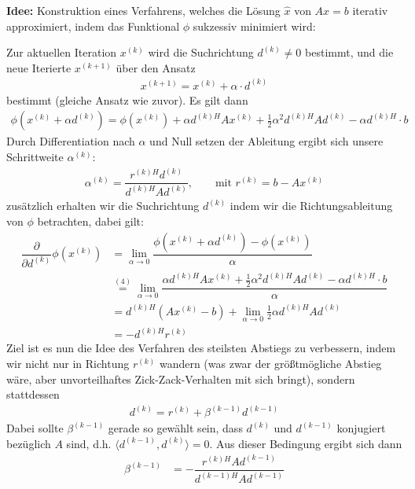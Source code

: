 \textbf{Idee:} Konstruktion eines Verfahrens, welches die Lösung $\hat{x}$ von $Ax=b$ iterativ approximiert, 
indem das Funktional $\phi$ sukzessiv minimiert wird: 

Zur aktuellen Iteration $x^{(k)}$ wird die Suchrichtung $d^{(k)}\neq 0$ bestimmt, und die neue Iterierte 
$x^{(k+1)}$ über den Ansatz
% 
\begin{align*}
  x^{(k+1)} 
  = x^{(k)} + \alpha\cdot d^{(k)} 
  \tag{3}\label{eq:CGVeq3}
\end{align*}
%
bestimmt (gleiche Ansatz wie zuvor). Es gilt dann
%
\begin{align*}
  \phi(x^{(k)}+\alpha d^{(k)}) 
  = \phi(x^{(k)}) + \alpha d^{(k)H}A x^{(k)} + \tfrac{1}{2}\alpha^2 {d^{(k)H}}Ad^{(k)}-\alpha{d^{(k)H}}\cdot b 
  \tag{4}\label{eq:CGVeq4}
\end{align*}
%
Durch Differentiation nach $\alpha$ und Null setzen der Ableitung ergibt sich unsere Schrittweite $\alpha^{(k)}$:
%
\begin{align*}
  \alpha^{(k)} 
  = \dfrac{{r^{(k)H}} d^{(k)}}{{d^{(k)H}} A d^{(k)}},
  \qquad \text{mit } 
  r^{(k)}
  = b-Ax^{(k)} 
  \tag{5}\label{eq:CGVeq5}
\end{align*}
zusätzlich erhalten wir die Suchrichtung $d^{(k)}$ indem wir die Richtungsableitung von $\phi$ betrachten, dabei gilt:
%
\begin{align*}
  \dfrac{\partial}{\partial d^{(k)}} \phi(x^{(k)}) 
  &= \lim_{\alpha\to 0} \dfrac{\phi(x^{(k)}+\alpha d^{(k)}) - \phi(x^{(k)})}{\alpha} \\
  &\stackrel{(4)}{=} \lim_{\alpha\to 0} 
  \dfrac{\alpha d^{(k)H}A x^{(k)} + \tfrac{1}{2}\alpha^2 {d^{(k)H}}Ad^{(k)}-\alpha{d^{(k)H}}\cdot b}{\alpha} \\
  &= d^{(k)H}(Ax^{(k)}-b) + \lim_{\alpha\to 0} \tfrac{1}{2}\alpha {d^{(k)H}}Ad^{(k)} \\
  &= -d^{(k)H}r^{(k)}
\end{align*}
%
Ziel ist es nun die Idee des Verfahren des steilsten Abstiegs zu verbessern, indem wir nicht nur in Richtung 
$r^{(k)}$ wandern (was zwar der größtmögliche Abstieg wäre, aber unvorteilhaftes \glqq{}Zick-Zack-Verhalten\grqq{} 
mit sich bringt), sondern stattdessen 
%
\begin{align*}
  d^{(k)} = r^{(k)} + \beta^{(k-1)} d^{(k-1)}
  \tag{6}\label{eq:CGVeq6}
\end{align*}
%
Dabei sollte $\beta^{(k-1)}$ gerade so gewählt sein, dass 
$d^{(k)}$ und $d^{(k-1)}$ konjugiert bezüglich $A$ sind, d.h. $\langle d^{(k-1)}, d^{(k)} \rangle = 0$. Aus dieser 
Bedingung ergibt sich dann 
%
\begin{align*}
  \beta^{(k-1)} &= -\dfrac{r^{(k)H}Ad^{(k-1)}}{d^{(k-1)H}Ad^{(k-1)}} 
  \tag{7}\label{eq:CGVeq7}
\end{align*}

